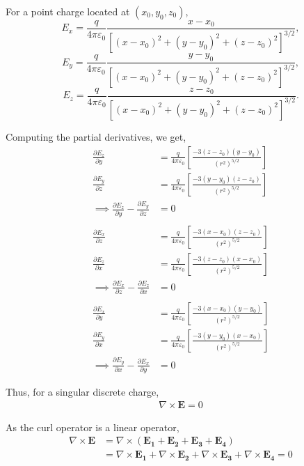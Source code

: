 \documentclass[12pt]{article}
\providecommand{\brak}[1]{\ensuremath{\left(#1\right)}}
\begin{document}
For a point charge located at $\brak{x_0, y_0, z_0}$,
\begin{equation}
    E_x = \frac{q}{4\pi\varepsilon_0} \frac{x - x_0}{[(x - x_0)^2 + (y - y_0)^2 + (z - z_0)^2]^{3/2}},
\end{equation}
\begin{equation}
    E_y = \frac{q}{4\pi\varepsilon_0} \frac{y - y_0}{[(x - x_0)^2 + (y - y_0)^2 + (z - z_0)^2]^{3/2}},
\end{equation}
\begin{equation}
    E_z = \frac{q}{4\pi\varepsilon_0} \frac{z - z_0}{[(x - x_0)^2 + (y - y_0)^2 + (z - z_0)^2]^{3/2}}.
\end{equation}

Computing the partial derivatives, we get,
\begin{align*}
    \frac{\partial E_z}{\partial y} &= \frac{q}{4\pi\varepsilon_0} \left[ \frac{-3(z - z_0)(y - y_0)}{(r^2)^{5/2}} \right]\\
    \frac{\partial E_y}{\partial z} &= \frac{q}{4\pi\varepsilon_0} \left[ \frac{-3(y - y_0)(z - z_0)}{(r^2)^{5/2}} \right]\\
    \implies \frac{\partial E_z}{\partial y} - \frac{\partial E_y}{\partial z} &= 0\\\\
    \frac{\partial E_x}{\partial z} &= \frac{q}{4\pi\varepsilon_0} \left[ \frac{-3(x - x_0)(z - z_0)}{(r^2)^{5/2}} \right]\\
    \frac{\partial E_z}{\partial x} &= \frac{q}{4\pi\varepsilon_0} \left[ \frac{-3(z - z_0)(x - x_0)}{(r^2)^{5/2}} \right]\\
    \implies\frac{\partial E_x}{\partial z} - \frac{\partial E_z}{\partial x} &= 0\\\\
    \frac{\partial E_x}{\partial y} &= \frac{q}{4\pi\varepsilon_0} \left[ \frac{-3(x - x_0)(y - y_0)}{(r^2)^{5/2}} \right]\\
    \frac{\partial E_y}{\partial x} &= \frac{q}{4\pi\varepsilon_0} \left[ \frac{-3(y - y_0)(x - x_0)}{(r^2)^{5/2}} \right]\\
    \implies\frac{\partial E_y}{\partial x} - \frac{\partial E_x}{\partial y} &= 0
\end{align*}

Thus, for a singular discrete charge,
\begin{align*}
    \nabla \times \mathbf{E} = 0
\end{align*}

As the curl operator is a linear operator,
\begin{align*}
    \nabla \times \mathbf{E} &= \nabla \times \brak{\mathbf{E_1 + E_2 + E_3 + E_4}} \\
    &= \nabla \times \mathbf{E_1} + \nabla \times \mathbf{E_2} + \nabla \times \mathbf{E_3} + \nabla \times \mathbf{E_4} = 0
\end{align*}
\end{document}
